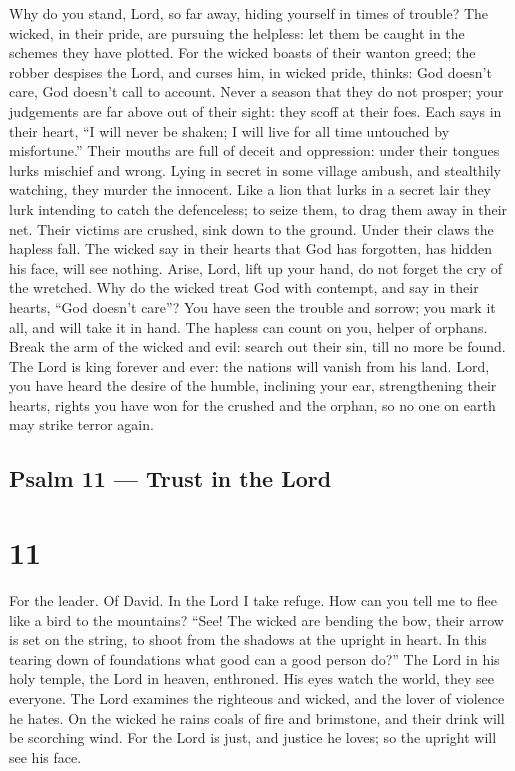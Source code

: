  Why do you stand, Lord, so far away, hiding yourself in
times of trouble?  The wicked, in their pride, are pursuing
the helpless: let them be caught in the schemes they have plotted.
 For the wicked boasts of their wanton greed; the robber
despises the Lord, and curses him,  in wicked pride, thinks:
God doesn't care, God doesn't call to account.  Never a
season that they do not prosper; your judgements are far above out of
their sight: they scoff at their foes.  Each says in their
heart, ``I will never be shaken; I will live for all time untouched by
misfortune.''  Their mouths are full of deceit and
oppression: under their tongues lurks mischief and wrong. 
Lying in secret in some village ambush, and stealthily watching, they
murder the innocent.  Like a lion that lurks in a secret
lair they lurk intending to catch the defenceless; to seize them, to
drag them away in their net.  Their victims are crushed,
sink down to the ground. Under their claws the hapless fall.
 The wicked say in their hearts that God has forgotten, has
hidden his face, will see nothing.  Arise, Lord, lift up
your hand, do not forget the cry of the wretched.  Why do
the wicked treat God with contempt, and say in their hearts, ``God
doesn't care''?  You have seen the trouble and sorrow; you
mark it all, and will take it in hand. The hapless can count on you,
helper of orphans.  Break the arm of the wicked and evil:
search out their sin, till no more be found.  The Lord is
king forever and ever: the nations will vanish from his land.
 Lord, you have heard the desire of the humble, inclining
your ear, strengthening their hearts,  rights you have won
for the crushed and the orphan, so no one on earth may strike terror
again.

\hypertarget{psalm-11-trust-in-the-lord}{%
\subsection{Psalm 11 --- Trust in the
Lord}\label{psalm-11-trust-in-the-lord}}

\hypertarget{section-10}{%
\section{11}\label{section-10}}

For the leader. Of David.  In the Lord I take refuge. How
can you tell me to flee like a bird to the mountains? 
``See! The wicked are bending the bow, their arrow is set on the string,
to shoot from the shadows at the upright in heart.  In this
tearing down of foundations what good can a good person do?''
 The Lord in his holy temple, the Lord in heaven, enthroned.
His eyes watch the world, they see everyone.  The Lord
examines the righteous and wicked, and the lover of violence he hates.
 On the wicked he rains coals of fire and brimstone, and
their drink will be scorching wind.  For the Lord is just,
and justice he loves; so the upright will see his face.

